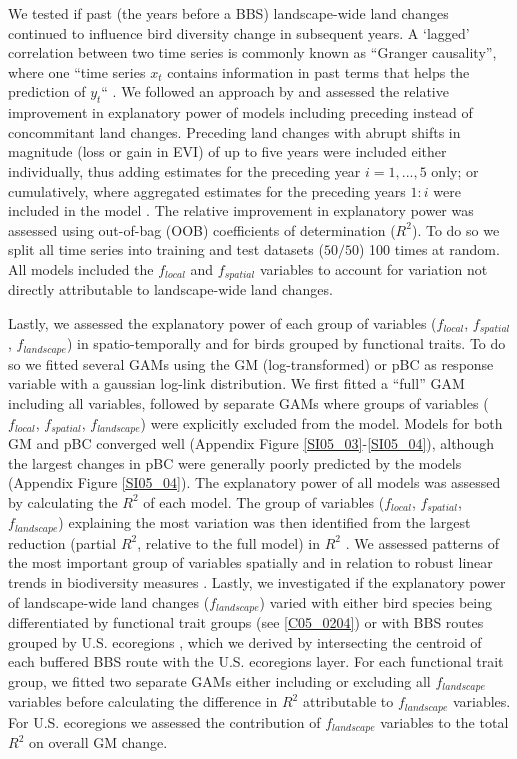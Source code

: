 We tested if past (\eg the years before a BBS) landscape-wide land changes continued to influence bird diversity change in subsequent years. A ‘lagged’ correlation between two time series is commonly known as “Granger causality”, where one “time series $x_t$ contains information in past terms that helps the prediction of $y_t$“ \citep{Granger1969}. We followed an approach by \cite{Papagiannopoulou2017} and assessed the relative improvement in explanatory power of models including preceding instead of concommitant land changes. Preceding land changes with abrupt shifts in magnitude (loss or gain in EVI) of up to five years were included either individually, thus adding estimates for the preceding year $i = 1,...,5$ only; or cumulatively, where aggregated estimates for the preceding years $1:i$ were included in the model \citep{Jung2018}. The relative improvement in explanatory power was assessed using out-of-bag (OOB) coefficients of determination ($R^2$). To do so we split all time series into training and test datasets ($50/50$) 100 times at random. All models included the $f_{local}$ and $f_{spatial}$ variables to account for variation not directly attributable to landscape-wide land changes.

Lastly, we assessed the explanatory power of each group of variables ($f_{local}$, $f_{spatial}$, $f_{landscape}$) in spatio-temporally and for birds grouped by functional traits. To do so we fitted several GAMs using the GM (log-transformed) or pBC as response variable with a gaussian log-link distribution. We first fitted a “full” GAM including all variables, followed by separate GAMs where groups of variables ($f_{local}$, $f_{spatial}$, $f_{landscape}$) were explicitly excluded from the model. Models for both GM and pBC converged well (Appendix Figure \ref{SI05_03}-\ref{SI05_04}), although the largest changes in pBC were generally poorly predicted by the models (Appendix Figure \ref{SI05_04}). The explanatory power of all models was assessed by calculating the $R^2$ of each model. The group of variables ($f_{local}$, $f_{spatial}$, $f_{landscape}$) explaining the most variation was then identified from the largest reduction (partial $R^2$, relative to the full model) in $R^2$ \citep{Papagiannopoulou2017}. We assessed patterns of the most important group of variables spatially and in relation to robust linear trends in biodiversity measures \citep[fitted using the MASS package, ver. 7.3-49,][]{Venables2002}. Lastly, we investigated if the explanatory power of landscape-wide land changes ($f_{landscape}$) varied with either bird species being differentiated by functional trait groups (see \ref{C05_0204}) or with BBS routes grouped by U.S. ecoregions \citep[Level 1,][]{Omernik1987}, which we derived by intersecting the centroid of each buffered BBS route with the U.S. ecoregions layer. For each functional trait group, we fitted two separate GAMs either including or excluding all $f_{landscape}$ variables before calculating the difference in $R^2$ attributable to $f_{landscape}$ variables. For U.S. ecoregions we assessed the contribution of $f_{landscape}$ variables to the total $R^2$ on overall GM change.

